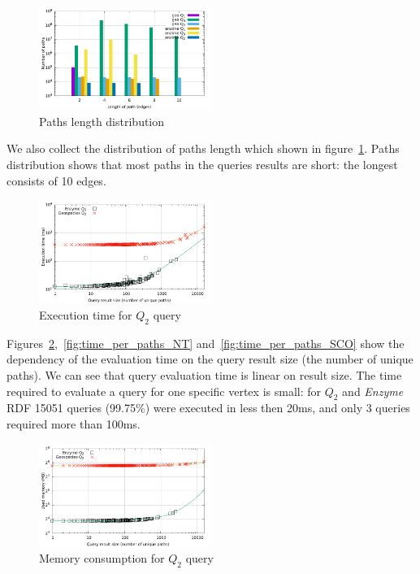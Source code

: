 {
\setlength{\belowcaptionskip}{-10pt}
\begin{figure}[h]
  \begin{center}
    \includegraphics[width=0.5\textwidth]{data/path_per_length.pdf}
    \caption{Paths length distribution}\label{fig:pLength}
  \end{center}
\end{figure}
}
We also collect the distribution of paths length which shown in figure~\ref{fig:pLength}.
Paths distribution shows that most paths in the queries results are short: the longest consists of 10 edges.
{
\setlength{\belowcaptionskip}{-15pt}
\begin{figure}[h]
  \begin{center}
    \includegraphics[width=0.5\textwidth]{data/time_per_paths_BT.pdf}
    \caption{Execution time for $Q_2$ query}
    \label{fig:time_per_paths_BT}
  \end{center}
\end{figure}
\vspace{-0.2cm}
}
Figures~\ref{fig:time_per_paths_BT},~\ref{fig:time_per_paths_NT} and~\ref{fig:time_per_paths_SCO} show the dependency of the evaluation time on the query result size (the number of unique paths).
We can see that query evaluation time is linear on result size.
The time required to evaluate a query for one specific vertex is small: for $Q_2$ and \emph{Enzyme} RDF 15051 queries (99.75\%) were executed in less then 20ms, and only 3 queries required more than 100ms.
{
\setlength{\belowcaptionskip}{-10pt}
\begin{figure}[ht]
  \begin{center}
    \includegraphics[width=0.5\textwidth]{data/mem_per_paths_BT.pdf}
    \caption{Memory consumption for $Q_2$ query}
    \label{fig:mem_per_paths_BT}
  \end{center}
\end{figure}
}
